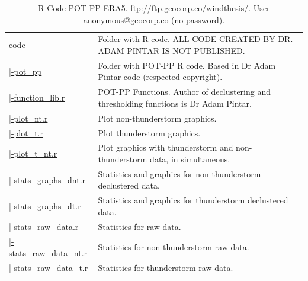 \documentclass[12pt,oneside]{reedthesis}
\begin{document}
\begingroup\fontsize{7}{9}\selectfont
\begin{longtable}[t]{>{\raggedright\arraybackslash}p{1.3in}>{\raggedright\arraybackslash}p{4.9in}}
\caption[R Code POT-PP ERA5]{\label{tab:codeera5}R Code POT-PP ERA5. \href{ftp://ftp.geocorp.co/windthesis/}{ftp://ftp.geocorp.co/windthesis/}. User anonymous@geocorp.co (no password).}\\
\toprule
\multicolumn{1}{l}{Folder Tree - Ftp Links} & \multicolumn{1}{l}{Description}\\
\midrule
\href{ftp://ftp.geocorp.co/windthesis/code/}{code} & Folder with R code. ALL CODE CREATED BY DR. ADAM PINTAR IS NOT PUBLISHED.\\
\href{ftp://ftp.geocorp.co/windthesis/code/pot_pp/}{\;\;|-pot\_pp} & Folder with POT-PP R code. Based in Dr Adam Pintar code (respected copyright).\\
\href{ftp://ftp.geocorp.co/windthesis/code/pot_pp/function_lib.r}{\;\;\;\;|-function\_lib.r} & POT-PP Functions. Author of declustering and thresholding functions is Dr Adam Pintar.\\
\href{ftp://ftp.geocorp.co/windthesis/code/pot_pp/plot_nt.r}{\;\;\;\;|-plot\_nt.r} & Plot non-thunderstorm graphics.\\
\href{ftp://ftp.geocorp.co/windthesis/code/pot_pp/plot_t.r}{\;\;\;\;|-plot\_t.r} & Plot thunderstorm graphics.\\
\href{ftp://ftp.geocorp.co/windthesis/code/pot_pp/plot_t_nt.r}{\;\;\;\;|-plot\_t\_nt.r} & Plot graphics with thunderstorm and non-thunderstorm data, in simultaneous.\\
\href{ftp://ftp.geocorp.co/windthesis/code/pot_pp/statistics_and_graphics_declustered_nt.r}{\;\;\;\;|-stats\_graphs\_dnt.r} & Statistics and graphics for non-thunderstorm declustered data.\\
\href{ftp://ftp.geocorp.co/windthesis/code/pot_pp/statistics_and_graphics_declustered_t.r}{\;\;\;\;|-stats\_graphs\_dt.r} & Statistics and graphics for thunderstorm declustered data.\\
\href{ftp://ftp.geocorp.co/windthesis/code/pot_pp/statistics_raw_data.r}{\;\;\;\;|-stats\_raw\_data.r} & Statistics for raw data.\\
\href{ftp://ftp.geocorp.co/windthesis/code/pot_pp/statistics_raw_data_nt.r}{\;\;\;\;|-stats\_raw\_data\_nt.r} & Statistics for non-thunderstorm raw data.\\
\href{ftp://ftp.geocorp.co/windthesis/code/pot_pp/statistics_raw_data_t.r}{\;\;\;\;|-stats\_raw\_data\_t.r} & Statistics for thunderstorm raw data.\\

\end{longtable}
\end{document}
